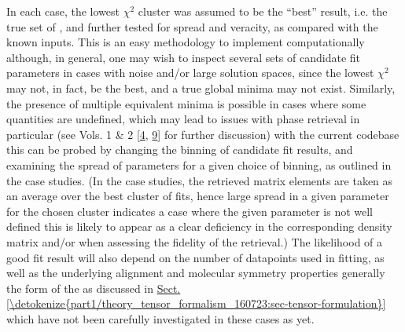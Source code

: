 \documentclass[letterpaper,table,10pt,english]{jupyterBook}
\begin{document}
\sphinxAtStartPar
In each case, the lowest \(\chi^2\) cluster was assumed to be the “best” result, i.e. the true set of {\hyperref[\detokenize{backmatter/glossary:term-radial-matrix-elements}]{}}, and further tested for spread and veracity, as compared with the known inputs. This is an easy methodology to implement computationally although, in general, one may wish to inspect several sets of candidate fit parameters in cases with noise and/or large solution spaces, since the lowest \(\chi^2\) may not, in fact, be the best, and a true global minima may not exist. Similarly, the presence of multiple equivalent minima is possible in cases where some quantities are undefined, which may lead to issues with phase retrieval in particular (see  Vols. 1 \& 2 {[}\hyperlink{cite.backmatter/bibliography:id677}{4}, \hyperlink{cite.backmatter/bibliography:id678}{9}{]} for further discussion) \sphinxhyphen{} with the current codebase this can be probed by changing the binning of candidate fit results, and examining the spread of parameters for a given choice of binning, as outlined in the case studies. (In the case studies, the retrieved matrix elements are taken as an average over the best cluster of fits, hence large spread in a given parameter for the chosen cluster indicates a case where the given parameter is not well defined \sphinxhyphen{} this is likely to appear as a clear deficiency in the corresponding density matrix and/or {\hyperref[\detokenize{backmatter/glossary:term-MF}]{}} when assessing the fidelity of the retrieval.) The likelihood of a good fit result will also depend on the number of data\sphinxhyphen{}points used in fitting, as well as the underlying alignment and molecular symmetry properties \sphinxhyphen{} generally the form of the {\hyperref[\detokenize{backmatter/glossary:term-channel-functions}]{}} as discussed in \hyperref[\detokenize{part1/theory_tensor_formalism_160723:sec-tensor-formulation}]{Sect.\@ \ref{\detokenize{part1/theory_tensor_formalism_160723:sec-tensor-formulation}}} \sphinxhyphen{} which have not been carefully investigated in these cases as yet.
\end{document}
